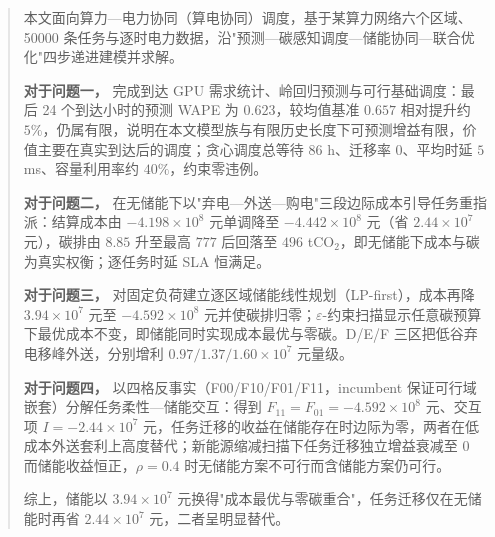 \begin{abstract}

本文面向算力—电力协同（算电协同）调度，基于某算力网络六个区域、50000 条任务与逐时电力数据，沿"预测—碳感知调度—储能协同—联合优化"四步递进建模并求解。

\textbf{对于问题一，} 完成到达 GPU 需求统计、岭回归预测与可行基础调度：最后 24 个到达小时的预测 WAPE 为 $0.623$，较均值基准 $0.657$ 相对提升约 $5\%$，仍属有限，说明在本文模型族与有限历史长度下可预测增益有限，价值主要在真实到达后的调度；贪心调度总等待 $86$ h、迁移率 $0$、平均时延 $5$ ms、容量利用率约 $40\%$，约束零违例。

\textbf{对于问题二，} 在无储能下以"弃电—外送—购电"三段边际成本引导任务重指派：结算成本由 $-4.198\times10^8$ 元单调降至 $-4.442\times10^8$ 元（省 $2.44\times10^7$ 元），碳排由 $8.85$ 升至最高 $777$ 后回落至 $496$ tCO$_2$，即无储能下成本与碳为真实权衡；逐任务时延 SLA 恒满足。

\textbf{对于问题三，} 对固定负荷建立逐区域储能线性规划（LP-first），成本再降 $3.94\times10^7$ 元至 $-4.592\times10^8$ 元并使碳排归零；$\varepsilon$-约束扫描显示任意碳预算下最优成本不变，即储能同时实现成本最优与零碳。D/E/F 三区把低谷弃电移峰外送，分别增利 $0.97/1.37/1.60\times10^7$ 元量级。

\textbf{对于问题四，} 以四格反事实（F00/F10/F01/F11，incumbent 保证可行域嵌套）分解任务柔性—储能交互：得到 $F_{11}=F_{01}=-4.592\times10^8$ 元、交互项 $I=-2.44\times10^7$ 元，任务迁移的收益在储能存在时边际为零，两者在低成本外送套利上高度替代；新能源缩减扫描下任务迁移独立增益衰减至 $0$ 而储能收益恒正，$\rho=0.4$ 时无储能方案不可行而含储能方案仍可行。

综上，储能以 $3.94\times10^7$ 元换得"成本最优与零碳重合"，任务迁移仅在无储能时再省 $2.44\times10^7$ 元，二者呈明显替代。

\end{abstract}